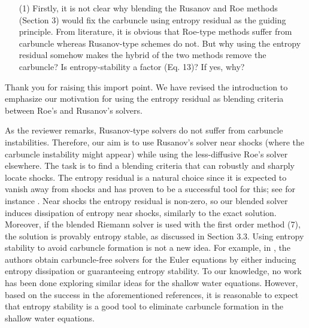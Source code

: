 \documentclass[english,11pt]{article}
\begin{document}
\bigskip
{\color{red}
  \begin{itemize}
    \item[(1)]
      Firstly, it is not clear why blending the Rusanov and Roe methods (Section 3) would fix the carbuncle
      using entropy residual as the guiding principle. From literature, it is obvious that Roe-type methods suffer
      from carbuncle whereas Rusanov-type schemes do not. But why using the entropy residual somehow
      makes the hybrid of the two methods remove the carbuncle? Is entropy-stability a factor (Eq. 13)? If yes,
      why?
  \end{itemize}
}
\noindent
Thank you for raising this import point. 
We have revised the introduction to emphasize our motivation for using the entropy residual as blending
criteria between Roe's and Rusanov's solvers. 

As the reviewer remarks, Rusanov-type solvers do not suffer from carbuncle instabilities. Therefore,
our aim is to use Rusanov's solver near shocks (where the carbuncle instability might appear) 
while using the less-diffusive Roe's solver elsewhere.
The task is to find a blending criteria that can robustly and sharply locate shocks.
The entropy residual is a natural choice since it is expected to vanish away
from shocks and has proven to be a successful tool for this; see for instance
\cite{guermond2011,guermond2018}. 
%
Near shocks the entropy residual is non-zero, so our blended solver induces dissipation of entropy near shocks,
similarly to the exact solution. Moreover, if the blended Riemann solver is used with the first order method (7),
the solution is provably entropy stable, as discussed in Section 3.3.
Using entropy stability to avoid carbuncle formation is not a new idea. For example, in \cite{ismail2009,ismail2009v2},
the authors obtain carbuncle-free solvers for the Euler equations by either inducing entropy dissipation or guaranteeing entropy stability. 
To our knowledge, no work has been done exploring similar ideas for the shallow water equations. However, based on
the success in the aforementioned references, it is reasonable to expect that entropy stability is a good tool to
eliminate carbuncle formation in the shallow water equations. 
%
\end{document}
